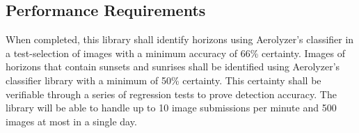 \documentclass[journal,10pt,draftclsnofoot,onecolumn]{IEEEtran}
\begin{document}
\begin{singlespace}
\subsection{Performance Requirements}
When completed, this library shall identify horizons using Aerolyzer's classifier in a test-selection of images with a minimum accuracy of 66\% certainty. Images of horizons that contain sunsets and sunrises shall be identified using Aerolyzer's classifier library with a minimum of 50\% certainty. This certainty shall be verifiable through a series of regression tests to prove detection accuracy.
The library will be able to handle up to 10 image submissions per minute and 500 images at most in a single day.


\nocite{*}




\end{singlespace}
\end{document}
